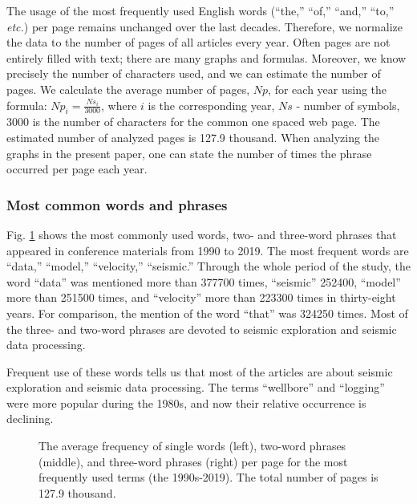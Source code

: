 \documentclass[geosciences,article,submit,moreauthors,pdftex]{Definitions/mdpi}
\begin{document}
The usage of the most frequently used English words (``the,'' ``of,'' ``and,'' ``to,'' \textit{etc.}) per page remains unchanged over the last decades. Therefore, we normalize the data to the number of pages of all articles every year. Often pages are not entirely filled with text; there are many graphs and formulas. Moreover, we know precisely the number of characters used, and we can estimate the number of pages.
We calculate the average number of pages, $Np$, for each year using the formula: $Np_i = \frac{Ns_i}{3000}$, where $i$ is the corresponding year, $Ns$ - number of symbols, 3000 is the number of characters for the common one spaced web page. The estimated number of analyzed pages is 127.9 thousand.
When analyzing the graphs in the present paper, one can state the number of times the phrase occurred per page each year.

\subsubsection{Most common words and phrases}
Fig. \ref{grams} shows the most commonly used words, two- and three-word phrases that appeared in conference materials from 1990 to 2019. The most frequent words are ``data,'' ``model,'' ``velocity,'' ``seismic.'' Through the whole period of the study, the word ``data'' was mentioned more than 377700 times, ``seismic'' 252400, ``model'' more than 251500 times, and ``velocity'' more than 223300 times in thirty-eight years. For comparison, the mention of the word ``that'' was 324250 times. Most of the three- and two-word phrases are devoted to seismic exploration and seismic data processing. 

Frequent use of these words tells us that most of the articles are about seismic exploration and seismic data processing. The terms ``wellbore'' and ``logging'' were more popular during the 1980s, and now their relative occurrence is declining. 

\begin{figure}[ht!]
\caption{The average frequency of single words (left), two-word phrases (middle), and three-word phrases (right) per page for the most frequently used terms (the 1990s-2019). The total number of pages is 127.9 thousand.}
\label{grams}
\end{figure}
\end{document}
